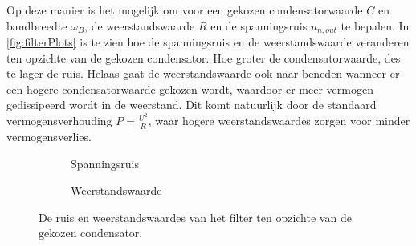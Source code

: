 Op deze manier is het mogelijk om voor een gekozen condensatorwaarde $C$ en bandbreedte $\omega_B$, de weerstandswaarde $R$ en de spanningsruis $u_{n,out}$ te bepalen.
In \autoref{fig:filterPlots} is te zien hoe de spanningsruis en de weerstandswaarde veranderen ten opzichte van de gekozen condensator. Hoe groter de condensatorwaarde, des te lager de ruis. Helaas gaat de weerstandswaarde ook naar beneden wanneer er een hogere condensatorwaarde gekozen wordt, waardoor er meer vermogen gedissipeerd wordt in de weerstand. Dit komt natuurlijk door de standaard vermogensverhouding $P = \frac{U^2}{R}$, waar hogere weerstandswaardes zorgen voor minder vermogensverlies.

\begin{figure}
    \centering
    \begin{subfigure}[b]{0.45\textwidth}
        \centering
        
        \caption{Spanningsruis}
        \label{fig:filterVoltageNoisePlot}
    \end{subfigure}
    \hfill
    \begin{subfigure}[b]{0.45\textwidth}
        \centering
        
        \caption{Weerstandswaarde}
        \label{fig:filterResistorPlot}
    \end{subfigure}
    \caption{De ruis en weerstandswaardes van het filter ten opzichte van de gekozen condensator.}
    \label{fig:filterPlots}
\end{figure}

